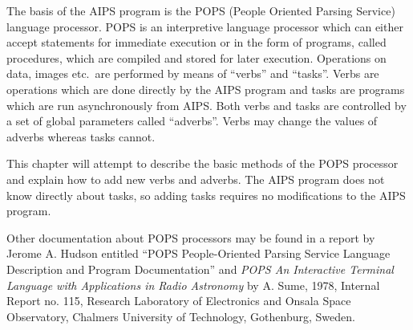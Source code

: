 The basis of the AIPS program is the POPS (People Oriented Parsing
Service) language processor.  POPS is an interpretive language
processor which can either accept statements for immediate execution or
in the form of programs, called procedures, which are compiled and
stored for later execution.  Operations on data, images etc.~are
performed by means of ``verbs'' and ``tasks''.  Verbs are operations which
are done directly by the AIPS program and tasks are programs which are
run asynchronously from AIPS.  Both verbs and tasks are controlled by
a set  of global parameters called ``adverbs''. Verbs may change the
values of adverbs whereas tasks cannot.

This chapter will attempt to describe the basic methods of the POPS
processor and explain how to add new verbs and adverbs. The AIPS
program does not know directly about tasks, so adding tasks requires
no modifications to the AIPS program.

Other documentation about POPS processors may be found in a report by
Jerome A. Hudson entitled ``POPS People-Oriented Parsing Service
Language Description and Program Documentation'' and {\it POPS An
Interactive Terminal Language with Applications in Radio Astronomy}
by A. Sume, 1978, Internal Report no. 115, Research Laboratory of
Electronics and Onsala Space Observatory, Chalmers University of
Technology, Gothenburg, Sweden.


